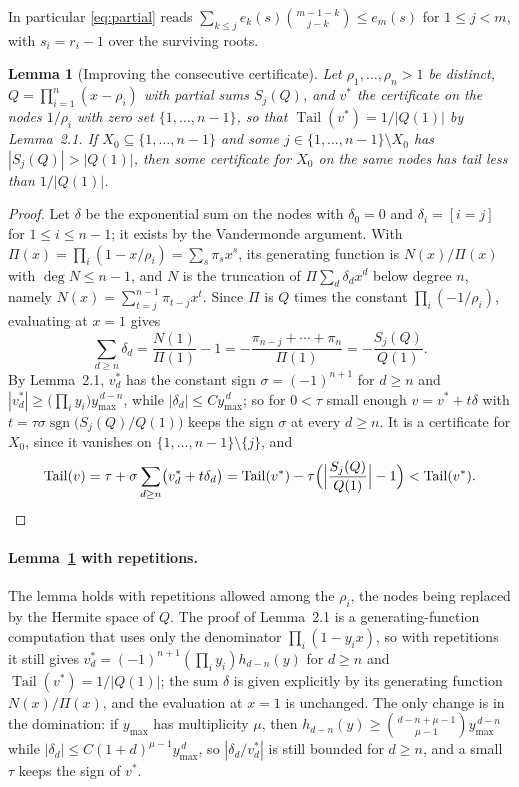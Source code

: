 \documentclass[11pt]{article}
\newtheorem{lemma}[theorem]{Lemma}
\theoremstyle{definition}
\theoremstyle{plain}
\DeclareMathOperator{\Tail}{Tail}
\DeclareMathOperator{\sgn}{sgn}
\begin{document}
In particular \eqref{eq:partial} reads
$\sum_{k\le j}e_k(s)\binom{m-1-k}{j-k}\le e_m(s)$ for $1\le j<m$, with
$s_i=r_i-1$ over the surviving roots.

\begin{lemma}[Improving the consecutive certificate]\label{lem:improve}
Let $\rho_1,\ldots,\rho_n>1$ be distinct, $Q=\prod_{i=1}^n(x-\rho_i)$ with
partial sums $S_j(Q)$, and $v^*$ the certificate on the nodes $1/\rho_i$ with
zero set $\{1,\ldots,n-1\}$, so that $\Tail(v^*)=1/|Q(1)|$ by Lemma~2.1.  If
$X_0\subseteq\{1,\ldots,n-1\}$ and some $j\in\{1,\ldots,n-1\}\setminus X_0$
has $|S_j(Q)|>|Q(1)|$, then some certificate for $X_0$ on the same nodes has
tail less than $1/|Q(1)|$.
\end{lemma}

\begin{proof}
Let $\delta$ be the exponential sum on the nodes with $\delta_0=0$ and
$\delta_i=[i=j]$ for $1\le i\le n-1$; it exists by the Vandermonde argument.
With $\Pi(x)=\prod_i(1-x/\rho_i)=\sum_s\pi_sx^s$, its generating function is
$N(x)/\Pi(x)$ with $\deg N\le n-1$, and $N$ is the truncation of
$\Pi\sum_d\delta_dx^d$ below degree $n$, namely
$N(x)=\sum_{t=j}^{n-1}\pi_{t-j}x^t$.  Since $\Pi$ is $Q$ times the constant
$\prod_i(-1/\rho_i)$, evaluating at $x=1$ gives
\[
  \sum_{d\ge n}\delta_d=\frac{N(1)}{\Pi(1)}-1
  =-\frac{\pi_{n-j}+\cdots+\pi_n}{\Pi(1)}
  =-\frac{S_j(Q)}{Q(1)} .
\]
By Lemma~2.1, $v^*_d$ has the constant sign $\sigma=(-1)^{n+1}$ for $d\ge n$
and $|v^*_d|\ge\bigl(\prod_iy_i\bigr)y_{\max}^{\,d-n}$, while
$|\delta_d|\le Cy_{\max}^{\,d}$; so for $0<\tau$ small enough
$v=v^*+t\delta$ with $t=\tau\sigma\sgn\bigl(S_j(Q)/Q(1)\bigr)$ keeps the sign
$\sigma$ at every $d\ge n$.  It is a certificate for $X_0$, since it vanishes
on $\{1,\ldots,n-1\}\setminus\{j\}$, and
\[
  \Tail(v)=\tau+\sigma\sum_{d\ge n}\bigl(v^*_d+t\delta_d\bigr)
  =\Tail(v^*)-\tau\Bigl(\Bigl|\frac{S_j(Q)}{Q(1)}\Bigr|-1\Bigr)
  <\Tail(v^*).
\]
\end{proof}

\paragraph{Lemma~\ref{lem:improve} with repetitions.}  The lemma holds with
repetitions allowed among the $\rho_i$, the nodes being replaced by the
Hermite space of $Q$.  The proof of Lemma~2.1 is a generating-function
computation that uses only the denominator $\prod_i(1-y_ix)$, so with
repetitions it still gives
$v^*_d=(-1)^{n+1}(\prod_iy_i)h_{d-n}(y)$ for $d\ge n$ and
$\Tail(v^*)=1/|Q(1)|$; the sum $\delta$ is given explicitly by its generating
function $N(x)/\Pi(x)$, and the evaluation at $x=1$ is unchanged.  The only
change is in the domination: if $y_{\max}$ has multiplicity $\mu$, then
$h_{d-n}(y)\ge\binom{d-n+\mu-1}{\mu-1}y_{\max}^{\,d-n}$ while
$|\delta_d|\le C(1+d)^{\mu-1}y_{\max}^{\,d}$, so $|\delta_d/v^*_d|$ is still
bounded for $d\ge n$, and a small $\tau$ keeps the sign of $v^*$.
\end{document}

